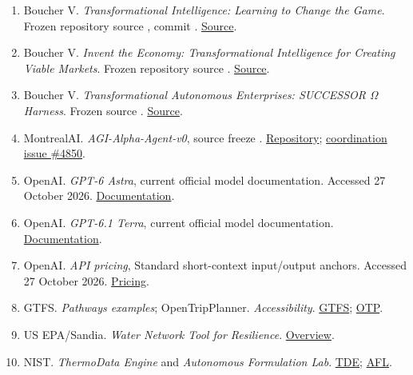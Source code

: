 \documentclass[10pt,a4paper]{article}
\begin{document}
\begin{enumerate}
  staff analysis.
  \href{https://www.chumontreal.qc.ca/en/crchum/core-facilities-and-services/cellular-imaging/services}{Services}.
\item
  Boucher V. \emph{Transformational Intelligence: Learning to Change the
  Game}. Frozen repository source
  , commit .
  \href{https://github.com/MontrealAI/AGI-Alpha-Agent-v0/blob/47c17f6aca6b1bb8779dd3e47d5ba5f8af3329f4/docs/Transformational_Intelligence.tex}{Source}.
\item
  Boucher V. \emph{Invent the Economy: Transformational Intelligence for
  Creating Viable Markets}. Frozen repository source
  .
  \href{https://github.com/MontrealAI/AGI-Alpha-Agent-v0/blob/47c17f6aca6b1bb8779dd3e47d5ba5f8af3329f4/docs/Invent_the_Economy.tex}{Source}.
\item
  Boucher V. \emph{Transformational Autonomous Enterprises: SUCCESSOR Ω
  Harness}. Frozen source
  .
  \href{https://github.com/MontrealAI/AGI-Alpha-Agent-v0/blob/47c17f6aca6b1bb8779dd3e47d5ba5f8af3329f4/docs/papers/transformational-autonomous-enterprises-v1.tex}{Source}.
\item
  MontrealAI. \emph{AGI-Alpha-Agent-v0}, source freeze
  .
  \href{https://github.com/MontrealAI/AGI-Alpha-Agent-v0}{Repository};
  \href{https://github.com/MontrealAI/AGI-Alpha-Agent-v0/issues/4850}{coordination
  issue \#4850}.
\item
  OpenAI. \emph{GPT-6 Astra}, current official model documentation.
  Accessed 27 October 2026.
  \href{https://developers.openai.com/api/docs/models/gpt-6-astra}{Documentation}.
\item
  OpenAI. \emph{GPT-6.1 Terra}, current official model documentation.
  \href{https://developers.openai.com/api/docs/models/gpt-6.1-terra}{Documentation}.
\item
  OpenAI. \emph{API pricing}, Standard short-context input/output
  anchors. Accessed 27 October 2026.
  \href{https://developers.openai.com/api/docs/pricing}{Pricing}.
\item
  GTFS. \emph{Pathways examples}; OpenTripPlanner. \emph{Accessibility}.
  \href{https://gtfs.org/documentation/schedule/examples/pathways/}{GTFS};
  \href{https://docs.opentripplanner.org/en/latest/Accessibility/}{OTP}.
\item
  US EPA/Sandia. \emph{Water Network Tool for Resilience}.
  \href{https://usepa.github.io/WNTR/overview.html}{Overview}.
\item
  NIST. \emph{ThermoData Engine} and \emph{Autonomous Formulation Lab}.
  \href{https://trc.nist.gov/tde.html}{TDE};
  \href{https://www.nist.gov/programs-projects/autonomous-formulation-lab}{AFL}.
\end{enumerate}
\end{document}
